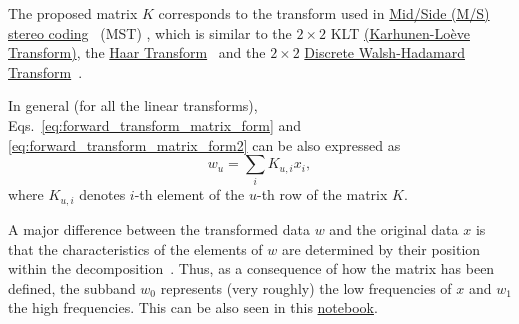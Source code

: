 The proposed matrix $K$ corresponds to the transform used in
\href{https://en.wikipedia.org/wiki/Joint_encoding#M/S_stereo_coding}{Mid/Side
  (M/S) stereo coding}~\cite{bosi2003intro} (MST) , which is similar
to the $2\times 2$ KLT
\href{http://fourier.eng.hmc.edu/e161/lectures/klt/node3.html}{(Karhunen-Lo\`eve
  Transform)}, the
\href{http://wavelets.pybytes.com/wavelet/haar/}{Haar
  Transform}~\cite{vetterli1995wavelets} and the $2\times 2$
\href{https://en.wikipedia.org/wiki/Hadamard_transform}{Discrete
  Walsh-Hadamard Transform}~\cite{sayood2017introduction}.

In general (for all the linear transforms),
Eqs.~\ref{eq:forward_transform_matrix_form} and
\ref{eq:forward_transform_matrix_form2} can be also expressed as
\begin{equation}
  w_u = \sum_i K_{u,i}x_i,
  \label{eq:forward_transform_linear_combination_form}
\end{equation}
where $K_{u,i}$ denotes $i$-th element of the $u$-th row of the matrix
$K$.

A major difference between the transformed data $w$ and the original
data $x$ is that the characteristics of the elements of $w$ are
determined by their position within the
decomposition~\cite{sayood2017introduction}. Thus, as a consequence of
how the matrix has been defined, the subband $w_0$ represents (very
roughly) the low frequencies of $x$ and $w_1$ the high
frequencies. This can be also seen in this
\href{https://github.com/Tecnologias-multimedia/intercom/blob/master/docs/stereo_transforms_RD.ipynb}{notebook}.

